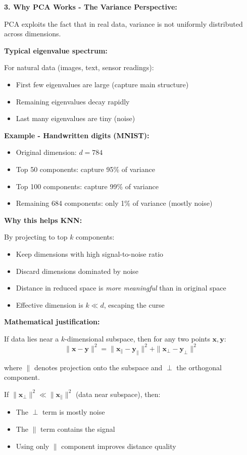 \documentclass[12pt]{article}
\begin{document}
\begin{explanation}
\textbf{3. Why PCA Works - The Variance Perspective:}

PCA exploits the fact that in real data, variance is not uniformly distributed across dimensions.

\textbf{Typical eigenvalue spectrum:}

For natural data (images, text, sensor readings):
\begin{itemize}
    \item First few eigenvalues are large (capture main structure)
    \item Remaining eigenvalues decay rapidly
    \item Last many eigenvalues are tiny (noise)
\end{itemize}

\textbf{Example - Handwritten digits (MNIST):}
\begin{itemize}
    \item Original dimension: \(d = 784\)
    \item Top 50 components: capture 95\% of variance
    \item Top 100 components: capture 99\% of variance
    \item Remaining 684 components: only 1\% of variance (mostly noise)
\end{itemize}

\textbf{Why this helps KNN:}

By projecting to top \(k\) components:
\begin{itemize}
    \item Keep dimensions with high signal-to-noise ratio
    \item Discard dimensions dominated by noise
    \item Distance in reduced space is \textit{more meaningful} than in original space
    \item Effective dimension is \(k \ll d\), escaping the curse
\end{itemize}

\textbf{Mathematical justification:}

If data lies near a \(k\)-dimensional subspace, then for any two points \(\mathbf{x}, \mathbf{y}\):
\[
\|\mathbf{x} - \mathbf{y}\|^2 = \|\mathbf{x}_{\parallel} - \mathbf{y}_{\parallel}\|^2 + \|\mathbf{x}_{\perp} - \mathbf{y}_{\perp}\|^2
\]

where \(\parallel\) denotes projection onto the subspace and \(\perp\) the orthogonal component.

If \(\|\mathbf{x}_{\perp}\|^2 \ll \|\mathbf{x}_{\parallel}\|^2\) (data near subspace), then:
\begin{itemize}
    \item The \(\perp\) term is mostly noise
    \item The \(\parallel\) term contains the signal
    \item Using only \(\parallel\) component improves distance quality
\end{itemize}


\end{explanation}
\end{document}

